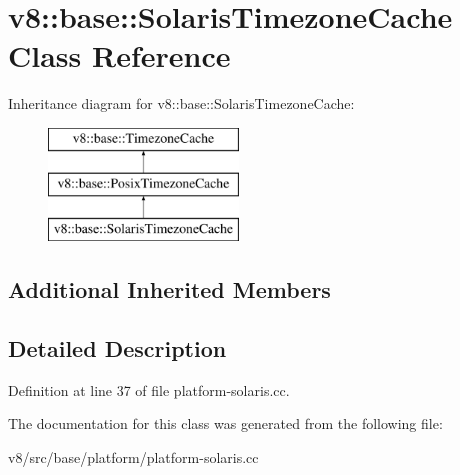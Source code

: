 \hypertarget{classv8_1_1base_1_1SolarisTimezoneCache}{}\section{v8\+:\+:base\+:\+:Solaris\+Timezone\+Cache Class Reference}
\label{classv8_1_1base_1_1SolarisTimezoneCache}
Inheritance diagram for v8\+:\+:base\+:\+:Solaris\+Timezone\+Cache\+:\begin{figure}[H]
\begin{center}
\leavevmode
\includegraphics[height=3.000000cm]{classv8_1_1base_1_1SolarisTimezoneCache}
\end{center}
\end{figure}
\subsection*{Additional Inherited Members}


\subsection{Detailed Description}


Definition at line 37 of file platform-\/solaris.\+cc.



The documentation for this class was generated from the following file\+:\begin{DoxyCompactItemize}
\item 
v8/src/base/platform/platform-\/solaris.\+cc\end{DoxyCompactItemize}
